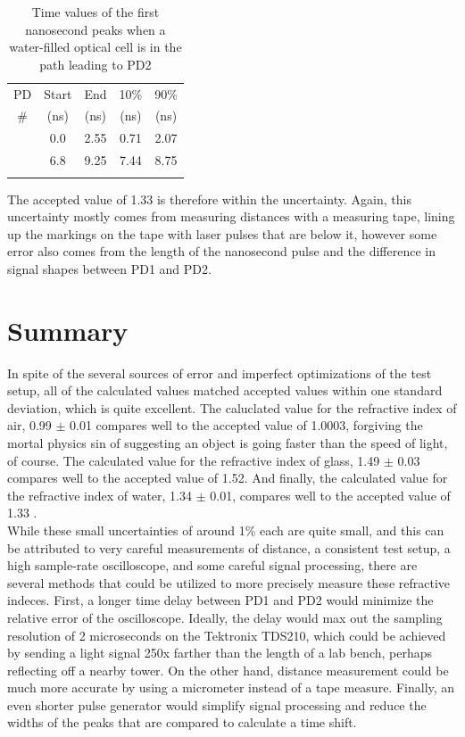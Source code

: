 \documentclass[aps,prl,reprint]{revtex4-2}
\begin{document}
\begin{table}[h]
\renewcommand{\arraystretch}{1.35}
\setlength{\tabcolsep}{10pt}
\caption{\label{TD_D3}Time values of the first nanosecond peaks when a water-filled optical cell is in the path leading to PD2}
\begin{tabular}{|c|c|c|c|c|}
\toprule
PD & Start & End & 10\% & 90\% \\
\# & (ns)& (ns)& (ns)& (ns)\\
\colrule
1 &    0.0 &  2.55 &  0.71 &  2.07 \\
\colrule
2 &    6.8 &  9.25 &  7.44 &  8.75 \\
\hline
\botrule
\end{tabular}
\end{table}

The accepted value of 1.33 is therefore within the uncertainty. Again, this uncertainty
mostly comes from measuring distances with a measuring tape, lining up the markings
on the tape with laser pulses that are below it, however some error also comes from
the length of the nanosecond pulse and the difference in signal shapes between PD1 
and PD2. \\



\section{Summary}

In spite of the several sources of error and imperfect optimizations of the test setup, 
all of the calculated values matched accepted values within one standard deviation,
which is quite excellent. The caluclated value for the refractive index of air, 0.99 $\pm$ 0.01
compares well to the accepted value of 1.0003, forgiving the mortal physics sin of
suggesting an object is going faster than the speed of light, of course. The calculated
value for the refractive index of glass, 1.49 $\pm$ 0.03 compares well to the accepted
value of 1.52. And finally, the calculated value for the refractive index of water,
1.34 $\pm$ 0.01, compares well to the accepted value of 1.33 \cite{Index}. \\

While these small uncertainties of around 1\% each are quite small, and this can be attributed
to very careful measurements of distance, a consistent test setup, a high sample-rate
oscilloscope, and some careful signal processing, there are several methods that could
be utilized to more precisely measure these refractive indeces. First, a longer time delay 
between PD1 and PD2 would minimize the relative error of the oscilloscope. Ideally, the
delay would max out the sampling resolution of 2 microseconds on the Tektronix TDS210,
which could be achieved by sending a light signal 250x farther than the length of a lab bench,
perhaps reflecting off a nearby tower. On the other hand, distance measurement could be
much more accurate by using a micrometer instead of a tape measure. Finally, an even shorter
pulse generator would simplify signal processing and reduce the widths of the peaks that
are compared to calculate a time shift. \\
\end{document}
